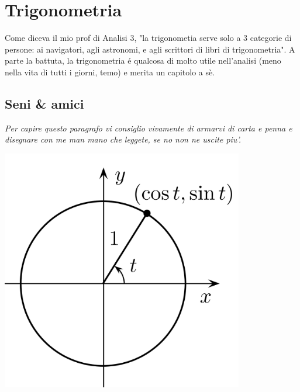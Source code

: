\chapter{Trigonometria}
\label{trigonometria}
\label{seniecoseni}

Come diceva il mio prof di Analisi 3, "la trigonometia serve solo a 3 categorie di persone: ai navigatori, 
agli astronomi, e agli scrittori di libri di trigonometria".
A parte la battuta, la trigonometria \'e qualcosa di molto utile nell'analisi
(meno nella vita di tutti i giorni, temo) e merita un capitolo a s\`e.

\section{Seni \& amici}

{\em Per capire questo paragrafo vi consiglio vivamente di armarvi di carta e penna e disegnare con me man mano che leggete, se no non ne uscite piu'.}

\includegraphics[height = 300pt, width = 300pt]{images/04trigonometria/circonferenza_goniometrica.png}

